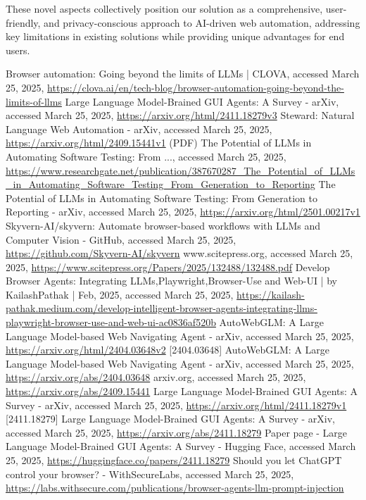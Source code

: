 \documentclass[conference]{IEEEtran}
\begin{document}
These novel aspects collectively position our solution as a comprehensive, user-friendly, and privacy-conscious approach to AI-driven web automation, addressing key limitations in existing solutions while providing unique advantages for end users.

\begin{thebibliography}{00}
     Browser automation: Going beyond the limits of LLMs | CLOVA, accessed March 25, 2025, \url{https://clova.ai/en/tech-blog/browser-automation-going-beyond-the-limits-of-llms}
     Large Language Model-Brained GUI Agents: A Survey - arXiv, accessed March 25, 2025, \url{https://arxiv.org/html/2411.18279v3}
     Steward: Natural Language Web Automation - arXiv, accessed March 25, 2025, \url{https://arxiv.org/html/2409.15441v1}
     (PDF) The Potential of LLMs in Automating Software Testing: From ..., accessed March 25, 2025, \url{https://www.researchgate.net/publication/387670287_The_Potential_of_LLMs_in_Automating_Software_Testing_From_Generation_to_Reporting}
     The Potential of LLMs in Automating Software Testing: From Generation to Reporting - arXiv, accessed March 25, 2025, \url{https://arxiv.org/html/2501.00217v1}
     Skyvern-AI/skyvern: Automate browser-based workflows with LLMs and Computer Vision - GitHub, accessed March 25, 2025, \url{https://github.com/Skyvern-AI/skyvern}
     www.scitepress.org, accessed March 25, 2025, \url{https://www.scitepress.org/Papers/2025/132488/132488.pdf}
     Develop Browser Agents: Integrating LLMs,Playwright,Browser-Use and Web-UI | by KailashPathak | Feb, 2025, accessed March 25, 2025, \url{https://kailash-pathak.medium.com/develop-intelligent-browser-agents-integrating-llms-playwright-browser-use-and-web-ui-ac0836af520b}
     AutoWebGLM: A Large Language Model-based Web Navigating Agent - arXiv, accessed March 25, 2025, \url{https://arxiv.org/html/2404.03648v2}
     [2404.03648] AutoWebGLM: A Large Language Model-based Web Navigating Agent - arXiv, accessed March 25, 2025, \url{https://arxiv.org/abs/2404.03648}
     arxiv.org, accessed March 25, 2025, \url{https://arxiv.org/abs/2409.15441}
     Large Language Model-Brained GUI Agents: A Survey - arXiv, accessed March 25, 2025, \url{https://arxiv.org/html/2411.18279v1}
     [2411.18279] Large Language Model-Brained GUI Agents: A Survey - arXiv, accessed March 25, 2025, \url{https://arxiv.org/abs/2411.18279}
     Paper page - Large Language Model-Brained GUI Agents: A Survey - Hugging Face, accessed March 25, 2025, \url{https://huggingface.co/papers/2411.18279}
     Should you let ChatGPT control your browser? - WithSecure\texttrademark Labs, accessed March 25, 2025, \url{https://labs.withsecure.com/publications/browser-agents-llm-prompt-injection}
\end{thebibliography}
\end{document}
